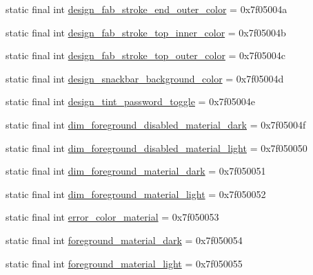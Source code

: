 \begin{DoxyCompactItemize}
\item 
static final int \mbox{\hyperlink{classandroid_1_1support_1_1design_1_1R_1_1color_a90f53392b91368cfa9ccc82ddb2f832d}{design\+\_\+fab\+\_\+stroke\+\_\+end\+\_\+outer\+\_\+color}} = 0x7f05004a
\item 
static final int \mbox{\hyperlink{classandroid_1_1support_1_1design_1_1R_1_1color_af4c410bd549cf381e12218489c5bd403}{design\+\_\+fab\+\_\+stroke\+\_\+top\+\_\+inner\+\_\+color}} = 0x7f05004b
\item 
static final int \mbox{\hyperlink{classandroid_1_1support_1_1design_1_1R_1_1color_a06bcbfb568481efb0dad54df0a2ee160}{design\+\_\+fab\+\_\+stroke\+\_\+top\+\_\+outer\+\_\+color}} = 0x7f05004c
\item 
static final int \mbox{\hyperlink{classandroid_1_1support_1_1design_1_1R_1_1color_a8a804a0e2e3fd52f3c386d672cdffe87}{design\+\_\+snackbar\+\_\+background\+\_\+color}} = 0x7f05004d
\item 
static final int \mbox{\hyperlink{classandroid_1_1support_1_1design_1_1R_1_1color_aa96fdd961247fabd3460572032cc428c}{design\+\_\+tint\+\_\+password\+\_\+toggle}} = 0x7f05004e
\item 
static final int \mbox{\hyperlink{classandroid_1_1support_1_1design_1_1R_1_1color_a8365b6d42a0ee37da75c99119f8dd10a}{dim\+\_\+foreground\+\_\+disabled\+\_\+material\+\_\+dark}} = 0x7f05004f
\item 
static final int \mbox{\hyperlink{classandroid_1_1support_1_1design_1_1R_1_1color_aa3a60b269d7e33b90c2dad08aaf68b76}{dim\+\_\+foreground\+\_\+disabled\+\_\+material\+\_\+light}} = 0x7f050050
\item 
static final int \mbox{\hyperlink{classandroid_1_1support_1_1design_1_1R_1_1color_ab8a94cd46177343a91105b918d61508a}{dim\+\_\+foreground\+\_\+material\+\_\+dark}} = 0x7f050051
\item 
static final int \mbox{\hyperlink{classandroid_1_1support_1_1design_1_1R_1_1color_abc2b9e0a3a6c52f660f46f0936055388}{dim\+\_\+foreground\+\_\+material\+\_\+light}} = 0x7f050052
\item 
static final int \mbox{\hyperlink{classandroid_1_1support_1_1design_1_1R_1_1color_a93e9d399a1480c79b4e56a943420f56c}{error\+\_\+color\+\_\+material}} = 0x7f050053
\item 
static final int \mbox{\hyperlink{classandroid_1_1support_1_1design_1_1R_1_1color_a0d0dfa4680f7f421fba2e31829ad77ed}{foreground\+\_\+material\+\_\+dark}} = 0x7f050054
\item 
static final int \mbox{\hyperlink{classandroid_1_1support_1_1design_1_1R_1_1color_a63848c6f48c8f9f3196a62ebdd80a4ec}{foreground\+\_\+material\+\_\+light}} = 0x7f050055

\end{DoxyCompactItemize}
